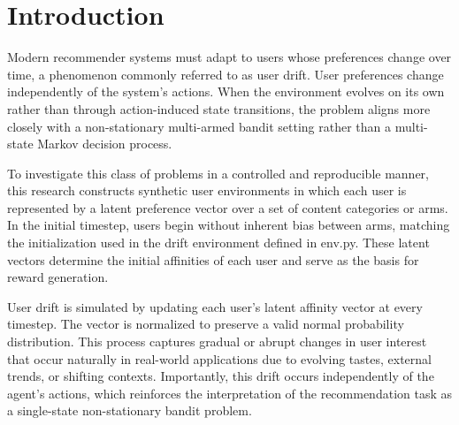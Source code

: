 \documentclass[pdflatex,sn-mathphys-num]{sn-jnl}
\theoremstyle{thmstyleone}%
\theoremstyle{thmstyletwo}%
\theoremstyle{thmstylethree}%
\begin{document}



\maketitle

\section{Introduction}\label{sec1}

Modern recommender systems must adapt to users whose preferences change over time, a phenomenon commonly referred to as user drift.
User preferences change independently of the system’s actions. When the environment evolves on its own rather than through action-induced state transitions, the problem aligns more closely with a non-stationary multi-armed bandit setting rather than a multi-state Markov decision process.

To investigate this class of problems in a controlled and reproducible manner, this research constructs synthetic user environments in which each user is represented by a latent preference vector over a set of content categories or arms. In the initial timestep, users begin without inherent bias between arms, matching the initialization used in the drift environment defined in env.py. These latent vectors determine the initial affinities of each user and serve as the basis for reward generation.

User drift is simulated by updating each user’s latent affinity vector at every timestep. The vector is normalized to preserve a valid normal probability distribution. This process captures gradual or abrupt changes in user interest that occur naturally in real-world applications due to evolving tastes, external trends, or shifting contexts. Importantly, this drift occurs independently of the agent’s actions, which reinforces the interpretation of the recommendation task as a single-state non-stationary bandit problem.
\end{document}
